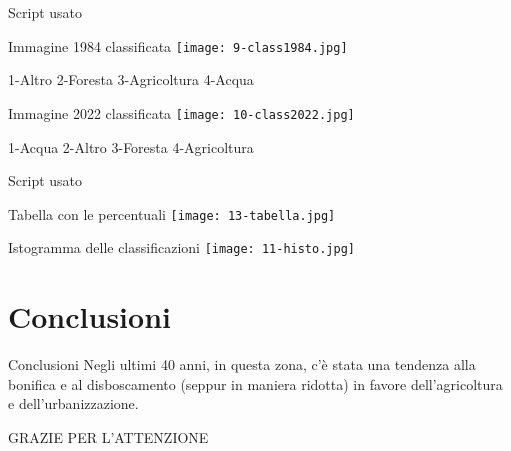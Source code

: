 \documentclass{beamer}
\begin{document}
\begin{frame}{Script usato}
    \begin{scriptsize}
        
    \end{scriptsize}
\end{frame}

\begin{frame}{Immagine 1984 classificata}
    \texttt{[image: 9-class1984.jpg]}
    \centering
    
    \medskip
    
1-Altro 2-Foresta 3-Agricoltura 4-Acqua
\end{frame}

\begin{frame}{Immagine 2022 classificata}
    \texttt{[image: 10-class2022.jpg]}
    \centering
    
    \medskip
    
    1-Acqua 2-Altro 3-Foresta 4-Agricoltura
\end{frame}

\begin{frame}{Script usato}
    \begin{tiny}
        
    \end{tiny}
\end{frame}

\begin{frame}{Tabella con le percentuali}
    \texttt{[image: 13-tabella.jpg]}
    \centering
\end{frame}

\begin{frame}{Istogramma delle classificazioni}
    \texttt{[image: 11-histo.jpg]}
    \centering
\end{frame}

\section{Conclusioni}

\begin{frame}{Conclusioni}
    Negli ultimi 40 anni, in questa zona, c'è stata una tendenza alla bonifica e al disboscamento (seppur in maniera ridotta) in favore dell'agricoltura e dell'urbanizzazione. 
\end{frame}

\begin{frame}
\begin{Huge}
GRAZIE PER L'ATTENZIONE
\end{Huge}
\end{frame}
\end{document}
